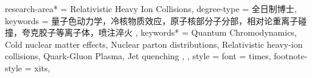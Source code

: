 {{      %
    research-area* = {Relativistic Heavy Ion Collisions},
    degree-type = {全日制博士},
    keywords = {
      量子色动力学，冷核物质效应，原子核部分子分部，相对论重离子碰撞，夸克胶子等离子体，喷注淬火
    },
    keywords* = {
      Quantum Chromodynamics, Cold nuclear matter effects, Nuclear parton distributions, Relativistic heavy-ion collisions, Quark-Gluon Plasma, Jet quenching
    },
  },
  style = {
    font = times,
    footnote-style = xits,
}}
